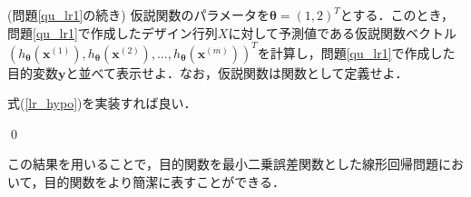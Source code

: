 \begin{qu}\label{qu_lr2}
(問題\ref{qu_lr1}の続き) 仮説関数のパラメータを$\bm{\theta}=(1,2)^T$とする．このとき，問題\ref{qu_lr1}で作成したデザイン行列$X$に対して予測値である仮説関数ベクトル$(h_{{\bm \theta}}({\bm x}^{(1)}),h_{{\bm \theta}}({\bm x}^{(2)}),\ldots,h_{{\bm \theta}}({\bm x}^{(m)}))^T$を計算し，問題\ref{qu_lr1}で作成した目的変数${\bm y}$と並べて表示せよ．なお，仮説関数は関数として定義せよ．
\end{qu}
\begin{ans}
式(\ref{lr_hypo})を実装すれば良い．
\begin{cod}[\texttt{lr2.py}]　
}]{code/lr2.py}
\vspace{-10pt}
\begin{lstlisting}
y_df=
         y   y_pred
0  17.5920  13.2202
1   9.1302  12.0554
2  13.6620  18.0372
3  11.8540  15.0064
4   6.8233  12.7196
\end{lstlisting}
\end{cod}
\vspace{-10pt}
\qed
\end{ans}





この結果を用いることで，目的関数を最小二乗誤差関数とした線形回帰問題において，目的関数をより簡潔に表すことができる．

